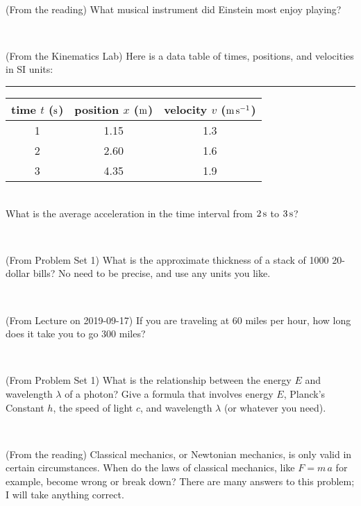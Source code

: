\documentclass[12pt, letterpaper]{article}
\begin{document}
\vfill ~

\begin{problem} (From the reading)
What musical instrument did Einstein most enjoy playing?
\end{problem}


\vfill ~

\begin{problem} (From the Kinematics Lab)
Here is a data table of times, positions, and velocities in SI units:\\
\rule{1.0in}{0pt}\begin{tabular}{c|c|c}
time $t$ ($\mathrm{s}$) & position $x$ ($\mathrm{m}$) & velocity $v$ ($\mathrm{m}\,\mathrm{s}^{-1}$) \\
\hline
1 & 1.15 & 1.3 \\
2 & 2.60 & 1.6 \\
3 & 4.35 & 1.9 \\
\hline
\end{tabular}\\
What is the average acceleration in the time interval from $2\,\mathrm{s}$ to $3\,\mathrm{s}$?
\end{problem}


\vfill ~


\clearpage


\begin{problem} (From Problem Set 1)
What is the approximate thickness of a stack of 1000 20-dollar bills?
No need to be precise, and use any units you like.
\end{problem}


\vfill ~

\begin{problem} (From Lecture on 2019-09-17)
If you are traveling at 60 miles per hour, how long does
it take you to go 300 miles?
\end{problem}


\vfill ~

\begin{problem} (From Problem Set 1)
What is the relationship between the energy $E$ and wavelength
$\lambda$ of a photon? Give a formula that involves energy $E$,
Planck's Constant $h$, the speed of light $c$, and wavelength
$\lambda$ (or whatever you need).
\end{problem}

\vfill ~

\begin{problem} (From the reading)
Classical mechanics, or Newtonian mechanics, is only valid in certain
circumstances. When do the laws of classical mechanics, like $F =
m\,a$ for example, become wrong or break down? There are many answers
to this problem; I will take anything correct.
\end{problem}
\end{document}
